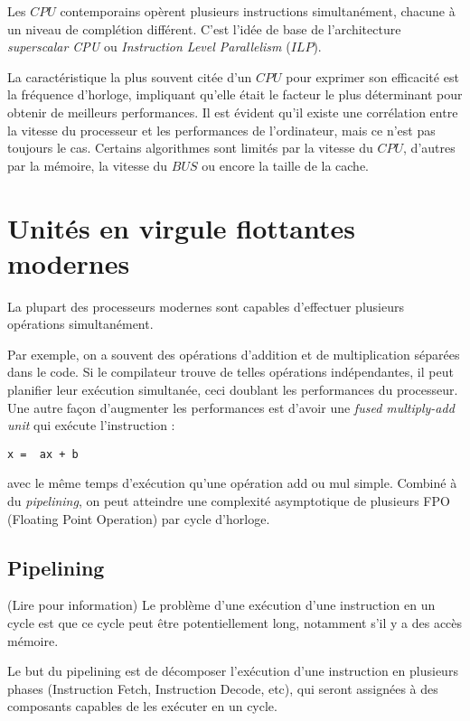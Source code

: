Les $CPU$ contemporains opèrent plusieurs instructions simultanément, chacune à un niveau de complétion différent. 
C'est l'idée de base de l'architecture \textit{superscalar CPU} ou \textit{Instruction Level Parallelism} ($ILP$).

La caractéristique la plus souvent citée d'un $CPU$ pour exprimer son efficacité est la fréquence d'horloge, impliquant
qu'elle était le facteur le plus déterminant pour obtenir de meilleurs performances. Il est évident qu'il existe une corrélation entre la vitesse du processeur et les performances de l'ordinateur, mais ce n'est pas toujours le cas. Certains algorithmes sont limités par la vitesse du $CPU$, d'autres par la mémoire, la vitesse du $BUS$ ou encore la taille de la cache.

\section{Unités en virgule flottantes modernes}

La plupart des processeurs modernes sont capables d'effectuer plusieurs opérations simultanément.

Par exemple, on a souvent des opérations d'addition et de multiplication séparées dans le code. Si le compilateur
 trouve de telles opérations indépendantes, il peut planifier leur exécution simultanée, ceci doublant les performances du processeur. Une autre façon d'augmenter les performances est d'avoir une \textit{fused multiply-add unit} qui exécute l'instruction : 
\begin{verbatim}
x =  ax + b 
\end{verbatim}
avec le même temps d'exécution qu'une opération add ou mul simple. Combiné à du \textit{pipelining}, on peut atteindre une complexité asymptotique de plusieurs FPO (Floating Point Operation) par cycle d'horloge.

	\subsection{Pipelining}
	
	(Lire pour information) Le problème d'une exécution d'une instruction en un cycle est que ce cycle peut être potentiellement long, notamment s'il y a des accès mémoire.
	
	Le but du pipelining est de décomposer l'exécution d'une instruction en plusieurs phases (Instruction Fetch, Instruction Decode, etc), qui seront assignées à des composants capables de les exécuter en un cycle.
	
